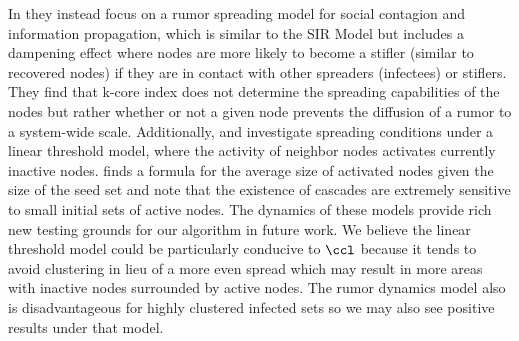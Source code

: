 In \cite{borgeMoreno} they instead focus on a rumor spreading model for social contagion and information propagation, which is similar to the SIR Model but includes a dampening effect where nodes are more likely to become a stifler (similar to recovered nodes) if they are in contact with other spreaders (infectees) or stiflers.   They find that k-core index does not determine the spreading capabilities of the nodes but rather whether or not a given node prevents the diffusion of a rumor to a system-wide scale.  Additionally, \cite{gleeson07} and \cite{kleinberg} investigate spreading conditions under a linear threshold model, where the activity of neighbor nodes activates currently inactive nodes.  \cite{gleeson07} finds a formula for the average size of activated nodes given the size of the seed set and note that the existence of cascades are extremely sensitive to small initial sets of active nodes.  The dynamics of these models provide rich new testing grounds for our algorithm in future work.  We believe the linear threshold model could be particularly conducive to $\ccl$ because it tends to avoid clustering in lieu of a more even spread which may result in more areas with inactive nodes surrounded by active nodes.  The rumor dynamics model also is disadvantageous for highly clustered infected sets so we may also see positive results under that model.





